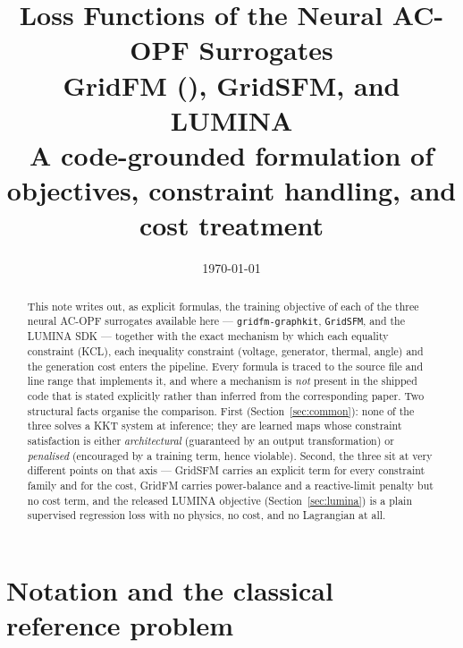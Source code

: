 \documentclass[11pt]{article}
\title{Loss Functions of the Neural AC-OPF Surrogates\\
\large GridFM (\code{gridfm-graphkit}), GridSFM, and LUMINA\\[2pt]
\normalsize A code-grounded formulation of objectives, constraint handling, and cost treatment}
\author{}
\date{\today}
\newcommand{\code}[1]{\texttt{\small #1}}
\begin{document}
\maketitle

\begin{abstract}
\noindent
This note writes out, as explicit formulas, the training objective of each of the three
neural AC-OPF surrogates available here --- \code{gridfm-graphkit}, \code{GridSFM}, and the
LUMINA SDK --- together with the exact mechanism by which each equality constraint (KCL),
each inequality constraint (voltage, generator, thermal, angle) and the generation cost
enters the pipeline. Every formula is traced to the source file and line range that
implements it, and where a mechanism is \emph{not} present in the shipped code that is
stated explicitly rather than inferred from the corresponding paper. Two structural facts
organise the comparison. First (Section~\ref{sec:common}): none of the three solves a KKT
system at inference; they are learned maps whose constraint satisfaction is either
\emph{architectural} (guaranteed by an output transformation) or \emph{penalised}
(encouraged by a training term, hence violable). Second, the three sit at very different
points on that axis --- GridSFM carries an explicit term for every constraint family and
for the cost, GridFM carries power-balance and a reactive-limit penalty but no cost term,
and the released LUMINA objective (Section~\ref{sec:lumina}) is a plain supervised
regression loss with no physics, no cost, and no Lagrangian at all.
\end{abstract}

\tableofcontents

\section{Notation and the classical reference problem}
\label{sec:notation}
\end{document}

